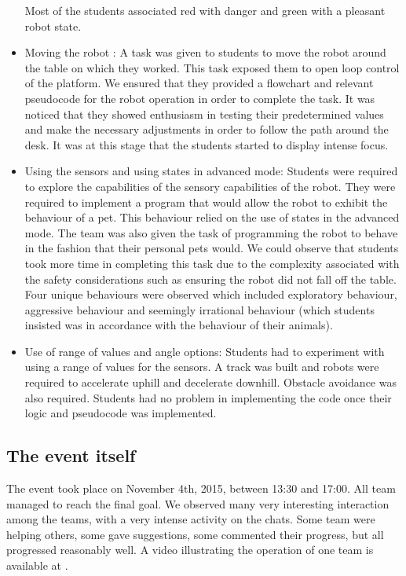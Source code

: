 \documentclass{intech-journal}
\begin{document}
\begin{itemize}
Most of the students associated red with danger and green with a pleasant robot state.
\item Moving the robot : A task was given to students to move the robot around the table on which they worked. This task exposed them to open loop control of the platform. We ensured that they provided a flowchart and relevant pseudocode for the robot operation in order to complete the task. It was noticed that they showed enthusiasm in testing their predetermined values and make the necessary adjustments in order to follow the path around the desk. It was at this stage that the students started to display intense focus.
\item Using the sensors and using states in advanced mode: Students were required to explore the capabilities of the sensory capabilities of the robot. 
They were required to implement a program that would allow the robot to exhibit the behaviour of a pet. 
This behaviour relied on the use of states in the advanced mode. 
The team was also given the task of programming the robot to behave in the fashion that their personal pets would.  We could observe that students took more time in completing this task due to the complexity associated with the safety considerations such as ensuring the robot did not fall off the table. 
Four unique behaviours were observed which included exploratory behaviour, aggressive behaviour and seemingly irrational behaviour (which students insisted was in accordance with the behaviour of their animals).
\item Use of range of values and angle options: Students had to experiment with using a range of values for the sensors.
A track was built and robots were required to accelerate uphill and decelerate downhill. 
Obstacle avoidance was also required.
Students had no problem in implementing the code once their logic and pseudocode was implemented.
\end{itemize}

\subsection{The event itself}

The event took place on November 4th, 2015, between 13:30 and 17:00.
All team managed to reach the final goal.
We observed many very interesting interaction among the teams, with a very intense activity on the chats.
Some team were helping others, some gave suggestions, some commented their progress, but all progressed reasonably well.
A video illustrating the operation of one team is available at \cite{SwissinfoR2T2}.
\end{document}
